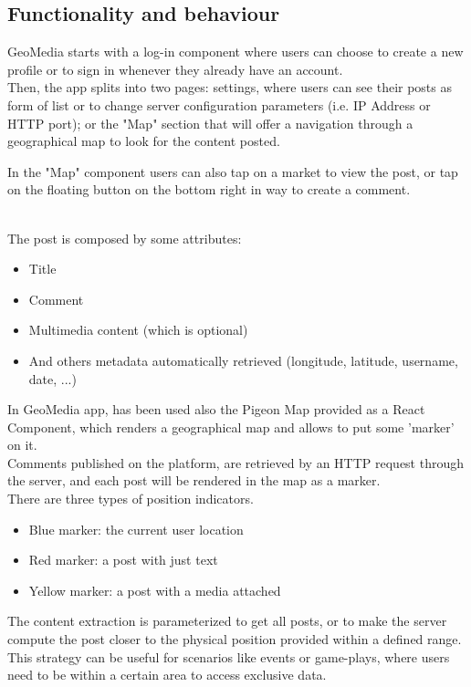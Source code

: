\documentclass[conference]{IEEEtran}
\begin{document}
\subsection{Functionality and behaviour}

GeoMedia starts with a log-in component where users can choose to create a new profile or to sign in whenever they already have an account.
\\
Then, the app splits into two pages: settings, where users can see their posts as form of list or to change server configuration parameters (i.e. IP Address or HTTP port); or the "Map" section that will offer a navigation through a geographical map to look for the content posted.


In the "Map" component users can also tap on a market to view the post, or tap on the floating button on the bottom right in way to create a comment.


\\The post is composed by some attributes:
\begin{itemize}
    \item Title
    \item Comment
    \item Multimedia content (which is optional)
    \item And others metadata automatically retrieved (longitude, latitude, username, date, ...)
\end{itemize}

In GeoMedia app, has been used also the Pigeon Map\cite{b8} provided as a React Component, which renders a geographical map and allows to put some 'marker' on it.
\\
Comments published on the platform, are retrieved by an HTTP request through the server, and each post will be rendered in the map as a marker.
\\There are three types of position indicators.
\begin{itemize}
\item Blue marker: the current user location
\item Red marker: a post with just text
\item Yellow marker: a post with a media attached 
\end{itemize}

The content extraction is parameterized to get all posts, or to make the server compute the post closer to the physical position provided within a defined range.
This strategy can be useful for scenarios like events or game-plays, where users need to be  within a certain area to access exclusive data.
\end{document}
